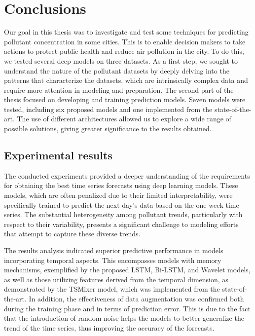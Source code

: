 \chapter*{Conclusions}


Our goal in this thesis was to investigate and test some techniques for predicting pollutant concentration in some cities. This is to enable decision makers to take actions to protect public health and reduce air pollution in the city. To do this, we tested several deep models on three datasets. As a first step, we sought to understand the nature of the pollutant datasets by deeply delving into the patterns that characterize the datasets, which are intrinsically complex data and require more attention in modeling and preparation. The second part of the thesis focused on developing and training prediction models. Seven models were tested, including six proposed models and one implemented from the state-of-the-art. The use of different architectures allowed us to explore a wide range of possible solutions, giving greater significance to the results obtained.

\section*{Experimental results}

The conducted experiments provided a deeper understanding of the requirements for obtaining the best time series forecasts using deep learning models. These models, which are often penalized due to their limited interpretability, were specifically trained to predict the next day's data based on the one-week time series.
The substantial heterogeneity among pollutant trends, particularly with respect to their variability, presents a significant challenge to modeling efforts that attempt to capture these diverse trends.

The results analysis indicated superior predictive performance in models incorporating temporal aspects. This encompasses models with memory mechanisms, exemplified by the proposed LSTM, Bi-LSTM, and Wavelet models, as well as those utilizing features derived from the temporal dimension, as demonstrated by the TSMixer model, which was implemented from the state-of-the-art. In addition, the effectiveness of data augmentation was confirmed both during the training phase and in terms of prediction error. This is due to the fact that the introduction of random noise helps the models to better generalize the trend of the time series, thus improving the accuracy of the forecasts.


